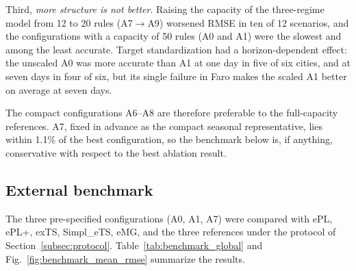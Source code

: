 \documentclass[preprint,12pt]{elsarticle}
\begin{document}
Third, \emph{more structure is not better}. Raising the capacity of the three-regime model from 12 to 20 rules (A7$\to$A9) worsened RMSE in ten of 12 scenarios, and the configurations with a capacity of 50 rules (A0 and A1) were the slowest and among the least accurate. Target standardization had a horizon-dependent effect: the unscaled A0 was more accurate than A1 at one day in five of six cities, and at seven days in four of six, but its single failure in Faro makes the scaled A1 better on average at seven days.

The compact configurations A6--A8 are therefore preferable to the full-capacity references. A7, fixed in advance as the compact seasonal representative, lies within 1.1\% of the best configuration, so the benchmark below is, if anything, conservative with respect to the best ablation result.

\subsection{External benchmark}
\label{subsec:external_benchmark}

The three pre-specified configurations (A0, A1, A7) were compared with ePL, ePL+, exTS, Simpl\_eTS, eMG, and the three references under the protocol of Section~\ref{subsec:protocol}. Table~\ref{tab:benchmark_global} and Fig.~\ref{fig:benchmark_mean_rmse} summarize the results.
\end{document}
